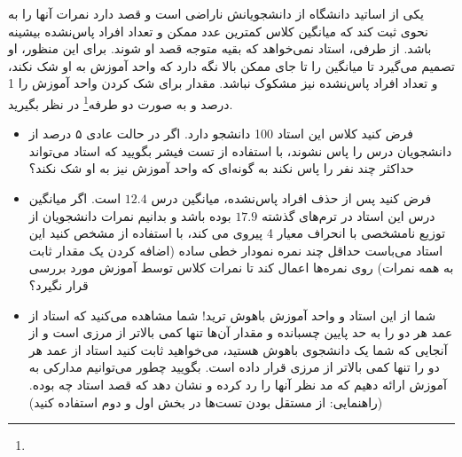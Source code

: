 یکی از اساتید دانشگاه از دانشجویانش ناراضی است و قصد دارد نمرات آنها را به نحوی ثبت کند که میانگین کلاس کمترین عدد ممکن و تعداد افراد پاس‌نشده بیشینه باشد. از طرفی، استاد نمی‌خواهد که بقیه متوجه قصد او شوند. برای این منظور، او تصمیم می‌گیرد تا میانگین را تا جای ممکن بالا نگه دارد که واحد آموزش به او شک نکند، و تعداد افراد پاس‌نشده نیز مشکوک نباشد. مقدار
برای شک کردن واحد آموزش را 1 درصد و به صورت دو طرفه\footnote{} در نظر بگیرید.
\begin{itemize}
    \item فرض کنید کلاس این استاد 100 دانشجو دارد. اگر در حالت عادی ۵ درصد از دانشجویان درس را پاس‌ نشوند، با استفاده از تست فیشر بگویید که استاد می‌تواند حداکثر چند نفر را پاس نکند به گونه‌ای که واحد آموزش نیز به او شک نکند؟
\item فرض کنید پس از حذف افراد پاس‌نشده، میانگین درس 
$12.4$
است. اگر میانگین درس این استاد در ترم‌های گذشته 
$17.9$
بوده باشد و بدانیم نمرات دانشجویان از توزیع نامشخصی با انحراف معیار 4 پیروی می کند، با استفاده از 
مشخص کنید این استاد می‌باست حداقل چند نمره نمودار خطی ساده (اضافه کردن یک مقدار ثابت به همه نمرات) روی نمره‌ها اعمال کند تا نمرات کلاس توسط آموزش مورد بررسی قرار نگیرد؟
\item شما از این استاد و واحد آموزش باهوش ترید! شما مشاهده می‌کنید که استاد از عمد هر دو 
را به حد پایین چسبانده و مقدار آن‌ها تنها کمی بالاتر از 
مرزی است و از آنجایی که شما یک دانشجوی باهوش هستید، می‌خواهید ثابت کنید استاد از عمد هر دو 
را تنها کمی بالاتر از 
مرزی قرار داده است.
بگویید چطور می‌توانیم مدارکی به آموزش ارائه دهیم که 
مد نظر آنها را رد کرده و نشان دهد که قصد استاد چه بوده.(راهنمایی: از مستقل بودن تست‌ها در بخش اول و دوم استفاده کنید)
\end{itemize}